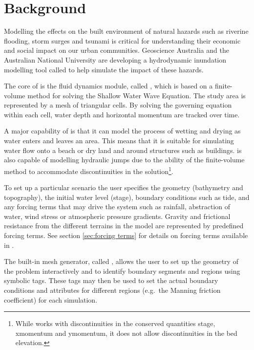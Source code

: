 \documentclass{manual}
\begin{document}
\pagebreak


\chapter{Background}

Modelling the effects on the built environment of natural hazards such
as riverine flooding, storm surges and tsunami is critical for
understanding their economic and social impact on our urban
communities.  Geoscience Australia and the Australian National
University are developing a hydrodynamic inundation modelling tool
called \anuga to help simulate the impact of these hazards.

The core of \anuga is the fluid dynamics module, called ,
which is based on a finite-volume method for solving the Shallow Water
Wave Equation.  The study area is represented by a mesh of triangular
cells.  By solving the governing equation within each cell, water
depth and horizontal momentum are tracked over time.

A major capability of \anuga is that it can model the process of
wetting and drying as water enters and leaves an area.  This means
that it is suitable for simulating water flow onto a beach or dry land
and around structures such as buildings.  \anuga is also capable
of modelling hydraulic jumps due to the ability of the finite-volume
method to accommodate discontinuities in the solution\footnote{
While \anuga works with discontinuities in the conserved quantities stage,
xmomentum and ymomentum, it does not allow discontinuities in the bed elevation.}.

To set up a particular scenario the user specifies the geometry
(bathymetry and topography), the initial water level (stage),
boundary conditions such as tide, and any forcing terms that may
drive the system such as rainfall, abstraction of water, wind stress or atmospheric pressure
gradients. Gravity and frictional resistance from the different
terrains in the model are represented by predefined forcing terms.
See section \ref{sec:forcing terms} for details on forcing terms available in \anuga.

The built-in mesh generator, called ,
allows the user to set up the geometry
of the problem interactively and to identify boundary segments and
regions using symbolic tags.  These tags may then be used to set the
actual boundary conditions and attributes for different regions
(e.g.\ the Manning friction coefficient) for each simulation.
\end{document}
